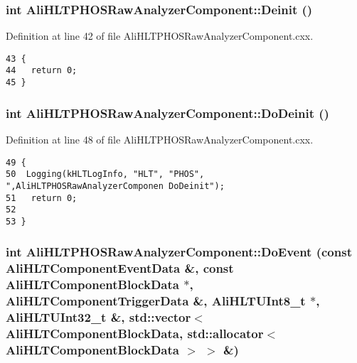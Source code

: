 \subsubsection{\setlength{\rightskip}{0pt plus 5cm}int Ali\-HLTPHOSRaw\-Analyzer\-Component::Deinit ()\hspace{0.3cm}{\tt  [virtual]}}\label{classAliHLTPHOSRawAnalyzerComponent_AliHLTPHOSRawAnalyzerPeakFinderComponenta7}




Definition at line 42 of file Ali\-HLTPHOSRaw\-Analyzer\-Component.cxx.

\footnotesize\begin{verbatim}43 {
44   return 0;
45 }
\end{verbatim}\normalsize 


\subsubsection{\setlength{\rightskip}{0pt plus 5cm}int Ali\-HLTPHOSRaw\-Analyzer\-Component::Do\-Deinit ()\hspace{0.3cm}{\tt  [virtual]}}\label{classAliHLTPHOSRawAnalyzerComponent_AliHLTPHOSRawAnalyzerPeakFinderComponenta8}




Definition at line 48 of file Ali\-HLTPHOSRaw\-Analyzer\-Component.cxx.

\footnotesize\begin{verbatim}49 {
50  Logging(kHLTLogInfo, "HLT", "PHOS", ",AliHLTPHOSRawAnalyzerComponen DoDeinit");
51   return 0;
52 
53 }
\end{verbatim}\normalsize 


\subsubsection{\setlength{\rightskip}{0pt plus 5cm}int Ali\-HLTPHOSRaw\-Analyzer\-Component::Do\-Event (const Ali\-HLTComponent\-Event\-Data \&, const Ali\-HLTComponent\-Block\-Data $\ast$, Ali\-HLTComponent\-Trigger\-Data \&, Ali\-HLTUInt8\_\-t $\ast$, Ali\-HLTUInt32\_\-t \&, std::vector$<$ Ali\-HLTComponent\-Block\-Data, std::allocator$<$ Ali\-HLTComponent\-Block\-Data $>$ $>$ \&)\hspace{0.3cm}{\tt  [virtual]}}\label{classAliHLTPHOSRawAnalyzerComponent_AliHLTPHOSRawAnalyzerPeakFinderComponenta12}




